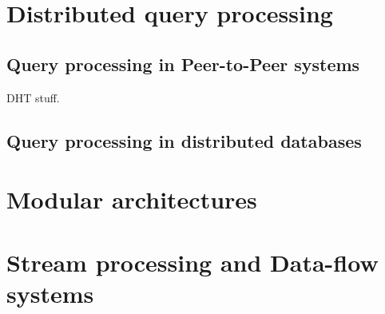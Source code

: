 \section{Distributed query processing}

\subsection{Query processing in Peer-to-Peer systems}
DHT stuff.

\subsection{Query processing in distributed databases}


\section{Modular architectures}


\section{Stream processing and Data-flow systems}